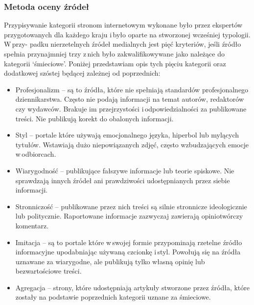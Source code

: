 \subsubsection{Metoda oceny źródeł} \label{metoda-oceny-zrodel}
Przypisywanie kategorii stronom internetowym wykonane było przez ekspertów przygotowanych dla każdego kraju i\,było oparte na stworzonej wcześniej typologii\cite{neudertpolarization2018}. W\,przy- padku nierzetelnych źródeł medialnych jest pięć kryteriów, jeśli źródło spełnia przynajmniej trzy z\,nich było zakwalifikowywane jako należące do kategorii ‘śmieciowe’. Poniżej przedstawiam opis tych pięciu kategorii oraz dodatkowej szóstej będącej zależnej od poprzednich:
\begin{itemize}
    \item Profesjonalizm – są to źródła, które nie spełniają standardów profesjonalnego dziennikarstwa. Często nie podają informacji na temat autorów, redaktorów czy wydawców. Brakuje im przejrzystości i\,odpowiedzialności za publikowane treści. Nie publikują korekt do obalonych informacji.
    \item Styl – portale które używają emocjonalnego języka, hiperbol lub mylących tytułów. Wstawiają dużo niepowiązanych zdjęć, często wzbudzających emocje w\,odbiorcach.
    \item Wiarygodność – publikujące fałszywe informacje lub teorie spiskowe. Nie sprawdzają innych źródeł ani prawdziwości udostępnianych przez siebie informacji.
    \item Stronniczość – publikowane przez nich treści są silnie stronnicze ideologicznie lub politycznie. Raportowane informacje zazwyczaj zawierają opiniotwórczy komentarz.
    \item Imitacja – są to portale które w\,swojej formie przypominają rzetelne źródło informacyjne upodabniając używaną czcionkę i\,styl. Powołują się na źródła uznawane za wiarygodne, ale publikują tylko własną opinię lub bezwartościowe treści.
    \item Agregacja – strony, które udostępniają artykuły stworzone przez źródła, które zostały na podstawie poprzednich kategorii uznane za śmieciowe.
\end{itemize}